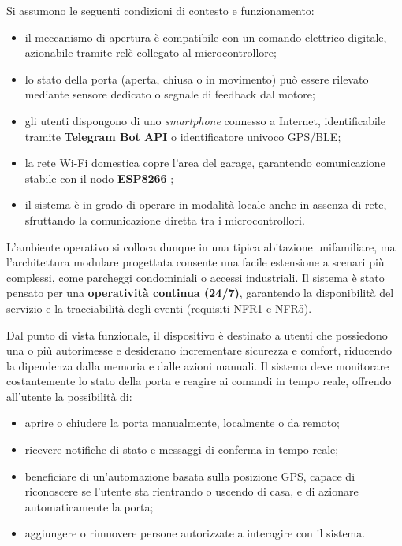 Si assumono le seguenti condizioni di contesto e funzionamento:
\begin{itemize}
    \item il meccanismo di apertura è compatibile con un comando elettrico digitale, azionabile tramite relè collegato al microcontrollore;
    \item lo stato della porta (aperta, chiusa o in movimento) può essere rilevato mediante sensore dedicato o segnale di feedback dal motore;
    \item gli utenti dispongono di uno \textit{smartphone} connesso a Internet, identificabile tramite \textbf{Telegram Bot API} \cite{TelegramAPI} o identificatore univoco GPS/BLE;
    \item la rete Wi-Fi domestica copre l’area del garage, garantendo comunicazione stabile con il nodo \textbf{ESP8266} \cite{ESP8266};
    \item il sistema è in grado di operare in modalità locale anche in assenza di rete, sfruttando la comunicazione diretta tra i microcontrollori.
\end{itemize}

L’ambiente operativo si colloca dunque in una tipica abitazione unifamiliare, ma l’architettura modulare progettata consente una facile estensione a scenari più complessi, come parcheggi condominiali o accessi industriali.  
Il sistema è stato pensato per una \textbf{operatività continua (24/7)}, garantendo la disponibilità del servizio e la tracciabilità degli eventi (requisiti NFR1 e NFR5).

Dal punto di vista funzionale, il dispositivo è destinato a utenti che possiedono una o più autorimesse e desiderano incrementare sicurezza e comfort, riducendo la dipendenza dalla memoria e dalle azioni manuali.  
Il sistema deve monitorare costantemente lo stato della porta e reagire ai comandi in tempo reale, offrendo all’utente la possibilità di:
\begin{itemize}
    \item aprire o chiudere la porta manualmente, localmente o da remoto;
    \item ricevere notifiche di stato e messaggi di conferma in tempo reale;
    \item beneficiare di un’automazione basata sulla posizione GPS, capace di riconoscere se l’utente sta rientrando o uscendo di casa, e di azionare automaticamente la porta;
    \item aggiungere o rimuovere persone autorizzate a interagire con il sistema.
\end{itemize}

